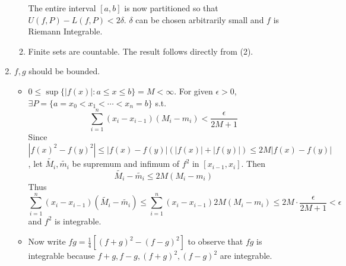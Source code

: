 \documentclass[11pt]{report}
\newcommand{\abs}[1]{\left|#1\right|}
\begin{document}
\begin{enumerate}
\begin{enumerate}
	The entire interval $[a,b]$ is now partitioned so that $U(f, P) - L(f, P) < 2\delta$. $\delta$ can be chosen arbitrarily small and $f$ is Riemann Integrable.

	\item Finite sets are countable. The result follows directly from (2).
\end{enumerate}

\item $f, g$ should be bounded.
\begin{itemize}
	\item $0\leq \sup\{\abs{f(x)}: a \leq x\leq b\} = M < \infty$. For given $\epsilon>0$, $\exists P = \{a = x_0 < x_1 < \cdots < x_n=b\}$ s.t.
	$$\sum_{i=1}^n(x_{i}-x_{i-1})(M_i-m_i) < \frac{\epsilon}{2M+1}$$
	Since $$\abs{f(x)^2 - f(y)^2} \leq \abs{f(x)-f(y)}(\abs{f(x)} + \abs{f(y)}) \leq 2M\abs{f(x)-f(y)}$$
	, let $\tilde{M_i}, \tilde{m_i}$ be supremum and infimum of $f^2$ in $[x_{i-1}, x_i]$. Then $$\tilde{M_i} - \tilde{m_i} \leq 2M(M_i-m_i)$$
	Thus $$ \sum_{i=1}^n(x_{i}-x_{i-1})(\tilde{M_i} - \tilde{m_i}) \leq \sum_{i=1}^n (x_{i} - x_{i-1}) 2M(M_i -m_i) \leq 2M \cdot \frac{\epsilon}{2M+1} < \epsilon $$
	and $f^2$ is integrable.
	\item Now write $fg = \frac{1}{4}[(f+g)^2-(f-g)^2]$ to observe that $fg$ is integrable because $f+g, f-g, (f+g)^2, (f-g)^2$ are integrable.
\end{itemize}
\end{enumerate}
\end{document}
